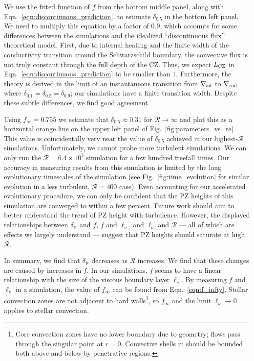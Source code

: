 \documentclass[twocolumn]{aastex631}
\newcommand{\gradrad}{\ensuremath{\nabla_{\rm{rad}}}}
\newcommand{\gradad}{\ensuremath{\nabla_{\rm{ad}}}}
\newcommand{\delp}{\ensuremath{\delta_{\rm{p}}}}
\newcommand{\mR}{\ensuremath{\mathcal{R}}}
\begin{document}
We use the fitted function of $f$ from the bottom middle panel, along with Eqn.~\ref{eqn:discontinuous_prediction}, to estimate $\delta_{0.5}$ in the bottom left panel.
We need to multiply this equation by a factor of 0.9, which accounts for some differences between the simulations and the idealized ``discontinuous flux'' theoretical model.
First, due to internal heating and the finite width of the conductivity transition around the Schwarzschild boundary, the convective flux is not truly constant through the full depth of the CZ.
Thus, we expect $L_{\rm{CZ}}$  in Eqn.~\ref{eqn:discontinuous_prediction} to be smaller than 1.
Furthermore, the theory is derived in the limit of an instantaneous transition from $\gradad$ to $\gradrad$ where $\delta_{0.1} = \delta_{0.5} = \delta_{0.9}$; our simulations have a finite transition width.
Despite these subtle differences, we find good agreement.

Using $f_\infty = 0.755$ we estimate that $\delta_{0.5} \approx 0.31$ for $\mR \rightarrow \infty$ and plot this as a horizontal orange line on the upper left panel of Fig.~\ref{fig:parameters_vs_re}.
This value is coincidentally very near the value of $\delta_{0.5}$ achieved in our highest-$\mR$ simulations.
Unfortunately, we cannot probe more turbulent simulations.
We can only run the $\mR = 6.4 \times 10^{3}$ simulation for a few hundred freefall times.
Our accuracy in measuring results from this simulation is limited by the long evolutionary timescales of the simulation (see Fig.~\ref{fig:time_evolution} for similar evolution in a less turbulent, $\mR = 400$ case).
Even accounting for our accelerated evolutionary procedure, we can only be confident that the PZ heights of this simulation are converged to within a few percent.
Future work should aim to better understand the trend of PZ height with turbulence.
However, the displayed relationships between $\delp$ and $f$, $f$ and $\ell_\nu$, and $\ell_\nu$ and $\mR$ --- all of which are effects we largely understand --- suggest that PZ heights should saturate at high $\mR$.

In summary, we find that $\delp$ decreases as $\mR$ increases.
We find that these changes are caused by increases in $f$.
In our simulations, $f$ seems to have a linear relationship with the size of the viscous boundary layer $\ell_\nu$.
By measuring $f$ and $\ell_\nu$ in a simulation, the value of $f_\infty$ can be found from Eqn.~\ref{eqn:f_infty}.
Stellar convection zones are not adjacent to hard walls\footnote{
Core convection zones have no lower boundary due to geometry; flows pass through the singular point at $r = 0$.
Convective shells in should be bounded both above and below by penetrative regions.
}, so $f_\infty$ and the limit $\ell_\nu \rightarrow 0$ applies to stellar convection.
\end{document}
